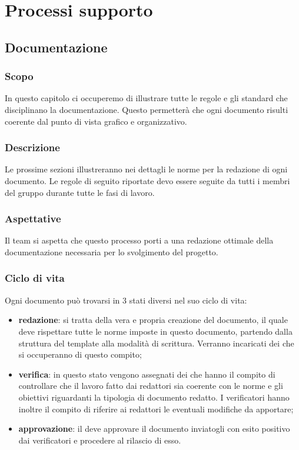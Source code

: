 \section{Processi supporto}
\subsection{Documentazione} \label{_processoDiDocumentazione}

\subsubsection{Scopo}
In questo capitolo ci occuperemo di illustrare tutte le regole e gli standard che disciplinano la documentazione. Questo permetterà che ogni documento risulti coerente dal punto di vista grafico e organizzativo.

\subsubsection{Descrizione}
Le prossime sezioni illustreranno nei dettagli le norme per la redazione di ogni documento.
Le regole di seguito riportate devo essere seguite da tutti i membri del gruppo durante tutte le fasi di lavoro.

\subsubsection{Aspettative}
Il team si aspetta che questo processo porti a una redazione ottimale della documentazione necessaria per lo svolgimento del progetto.

\subsubsection{Ciclo di vita}
Ogni documento può trovarsi in 3 stati diversi nel suo ciclo di vita:
\begin{itemize}
    \item\textbf{redazione}: si tratta della vera e propria creazione del documento, il quale deve rispettare tutte le norme imposte in questo documento, partendo dalla struttura del template alla modalità di scrittura. Verranno incaricati dei  che si occuperanno di questo compito;
    \item\textbf{verifica}: in questo stato vengono assegnati dei  che hanno il compito di controllare che il lavoro fatto dai redattori sia coerente con le norme e gli obiettivi riguardanti la tipologia di documento redatto. I verificatori hanno inoltre il compito di riferire ai redattori le eventuali modifiche da apportare;
    \item\textbf{approvazione}: il  deve approvare il documento inviatogli con esito positivo dai verificatori e procedere al rilascio di esso.
\end{itemize}


